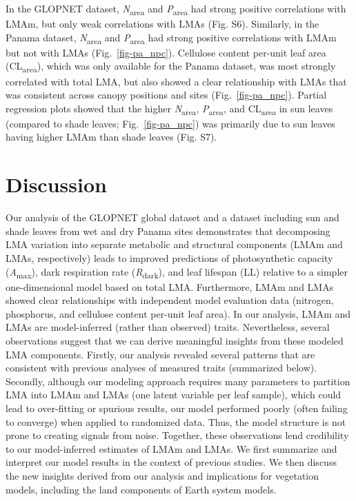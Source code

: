 \documentclass[
  12pt,
  letterpaper,
  DIV=11,
  numbers=noendperiod]{scrartcl}
\begin{document}
In the GLOPNET dataset, \emph{N}\textsubscript{area} and
\emph{P}\textsubscript{area} had strong positive correlations with LMAm,
but only weak correlations with LMAs (Fig. S6). Similarly, in the Panama
dataset, \emph{N}\textsubscript{area} and \emph{P}\textsubscript{area}
had strong positive correlations with LMAm but not with LMAs
(Fig.~\ref{fig-pa_npc}). Cellulose content per-unit leaf area
(CL\textsubscript{area}), which was only available for the Panama
dataset, was most strongly correlated with total LMA, but also showed a
clear relationship with LMAs that was consistent across canopy positions
and sites (Fig.~\ref{fig-pa_npc}). Partial regression plots showed that
the higher \emph{N}\textsubscript{area}, \emph{P}\textsubscript{area},
and CL\textsubscript{area} in sun leaves (compared to shade leaves;
Fig.~\ref{fig-pa_npc}) was primarily due to sun leaves having higher
LMAm than shade leaves (Fig. S7).

\section{Discussion}\label{discussion}

Our analysis of the GLOPNET global dataset and a dataset including sun
and shade leaves from wet and dry Panama sites demonstrates that
decomposing LMA variation into separate metabolic and structural
components (LMAm and LMAs, respectively) leads to improved predictions
of photosynthetic capacity (\emph{A}\textsubscript{max}), dark
respiration rate (\emph{R}\textsubscript{dark}), and leaf lifespan (LL)
relative to a simpler one-dimensional model based on total LMA.
Furthermore, LMAm and LMAs showed clear relationships with independent
model evaluation data (nitrogen, phosphorus, and cellulose content
per-unit leaf area). In our analysis, LMAm and LMAs are model-inferred
(rather than observed) traits. Nevertheless, several observations
suggest that we can derive meaningful insights from these modeled LMA
components. Firstly, our analysis revealed several patterns that are
consistent with previous analyses of measured traits (summarized below).
Secondly, although our modeling approach requires many parameters to
partition LMA into LMAm and LMAs (one latent variable per leaf sample),
which could lead to over-fitting or spurious results, our model
performed poorly (often failing to converge) when applied to randomized
data. Thus, the model structure is not prone to creating signals from
noise. Together, these observations lend credibility to our
model-inferred estimates of LMAm and LMAs. We first summarize and
interpret our model results in the context of previous studies. We then
discuss the new insights derived from our analysis and implications for
vegetation models, including the land components of Earth system models.
\end{document}
